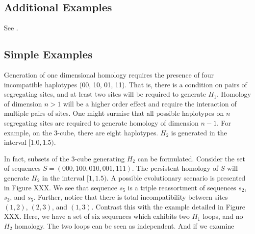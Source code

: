 \subsection{Additional Examples}

See \citet{Huson:2010}.

\subsection{Simple Examples}
\label{subsec:higher_dim_examples}
%
Generation of one dimensional homology requires the presence of four incompatible haplotypes (00, 10, 01, 11).
That is, there is a condition on pairs of segregating sites, and at least two sites will be required to generate $H_1$.
Homology of dimension $n>1$ will be a higher order effect and require the interaction of multiple pairs of sites.
One might surmise that all possible haplotypes on $n$ segregating sites are required to generate homology of dimension $n-1$.
For example, on the 3-cube, there are eight haplotypes.
$H_2$ is generated in the interval $[1.0,1.5)$.

In fact, subsets of the 3-cube generating $H_2$ can be formulated.
Consider the set of sequences $S=(000,100,010,001,111)$.
The persistent homology of $S$ will generate $H_2$ in the interval $[1,1.5)$.
A possible evolutionary scenario is presented in Figure XXX.
We see that sequence $s_5$ is a triple reassortment of sequences $s_2$, $s_3$, and $s_5$.
Further, notice that there is total incompatibility between sites $(1,2)$, $(2,3)$, and $(1,3)$.
Contrast this with the example detailed in Figure XXX.
Here, we have a set of six sequences which exhibits two $H_1$ loops, and no $H_2$ homology.
The two loops can be seen as independent.
And if we examine


